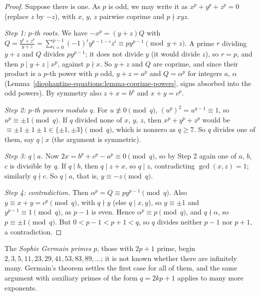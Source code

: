 \begin{proof}
Suppose there is one. As $p$ is odd, we may write it as $x^p + y^p + z^p = 0$ (replace $z$ by $-z$), with $x$, $y$, $z$ pairwise coprime and $p \nmid xyz$.

\emph{Step 1: $p$-th roots.} We have $-x^p = (y + z)Q$ with $Q = \frac{y^p + z^p}{y + z} = \sum_{i=0}^{p-1}(-1)^iy^{p-1-i}z^i \equiv py^{p-1} \pmod{y + z}$. A prime $r$ dividing $y + z$ and $Q$ divides
$py^{p-1}$; it does not divide $y$ (it would divide $z$), so $r = p$, and then $p \mid y + z \mid x^p$, against $p \nmid x$. So $y + z$ and $Q$ are coprime, and since their product is a $p$-th power with $p$
odd, $y + z = a^p$ and $Q = \alpha^p$ for integers $a$, $\alpha$ (Lemma~\ref{diophantine-equations:lemma-coprime-powers}, signs absorbed into the odd powers). By symmetry also $z + x = b^p$ and $x + y = c^p$.

\emph{Step 2: $p$-th powers modulo $q$.} For $u \not\equiv 0 \pmod q$, $(u^p)^2 = u^{q - 1} \equiv 1$, so $u^p \equiv \pm1 \pmod q$. If $q$ divided none of $x$, $y$, $z$, then $x^p + y^p + z^p$ would be
$\equiv \pm1 \pm1 \pm1 \in \{\pm1, \pm3\} \pmod q$, which is nonzero as $q \geq 7$. So $q$ divides one of them, say $q \mid x$ (the argument is symmetric).

\emph{Step 3: $q \mid a$.} Now $2x = b^p + c^p - a^p \equiv 0 \pmod q$, so by Step 2 again one of $a$, $b$, $c$ is divisible by $q$. If $q \mid b$, then $q \mid z + x$, so $q \mid z$, contradicting
$\gcd(x, z) = 1$; similarly $q \nmid c$. So $q \mid a$, that is, $y \equiv -z \pmod q$.

\emph{Step 4: contradiction.} Then $\alpha^p = Q \equiv py^{p-1} \pmod q$. Also $y \equiv x + y = c^p \pmod q$, with $q \nmid y$ (else $q \mid x, y$), so $y \equiv \pm1$ and $y^{p - 1} \equiv 1 \pmod q$, as
$p - 1$ is even. Hence $\alpha^p \equiv p \pmod q$, and $q \nmid \alpha$, so $p \equiv \pm1 \pmod q$. But $0 < p - 1 < p + 1 < q$, so $q$ divides neither $p - 1$ nor $p + 1$, a contradiction.
\end{proof}

\begin{example}\label{diophantine-equations:example-germain}
The \emph{Sophie Germain primes} $p$, those with $2p + 1$ prime, begin $2, 3, 5, 11, 23, 29, 41, 53, 83, 89, \dots$; it is not known whether there are infinitely many. Germain's theorem settles the first case for
all of them, and the same argument with auxiliary primes of the form $q = 2kp + 1$ applies to many more exponents.
\end{example}

